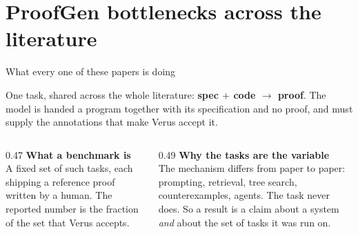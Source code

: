 \documentclass[aspectratio=169,10pt]{beamer}
\newcommand{\hd}[1]{\textbf{\color{lgTeal}#1}}
\begin{document}
\section{ProofGen bottlenecks across the literature}

\begin{frame}{What every one of these papers is doing}

{\scriptsize
One task, shared across the whole literature: \textbf{spec $+$ code $\rightarrow$ proof}. The
model is handed a program together with its specification and no proof, and must supply the
annotations that make Verus accept it.
}

\vspace{8pt}
\begin{center}
\end{center}

\vspace{8pt}
\begin{columns}[T]
\begin{column}{0.47\textwidth}
{\scriptsize
\hd{What a benchmark is}\\
A fixed set of such tasks, each shipping a reference proof written by a human. The reported
number is the fraction of the set that Verus accepts.
}
\end{column}

\begin{column}{0.49\textwidth}
{\scriptsize
\hd{Why the tasks are the variable}\\
The mechanism differs from paper to paper: prompting, retrieval, tree search, counterexamples,
agents. The task never does. So a result is a claim about a system \emph{and} about the set of
tasks it was run on.
}
\end{column}
\end{columns}

\end{frame}
\end{document}
